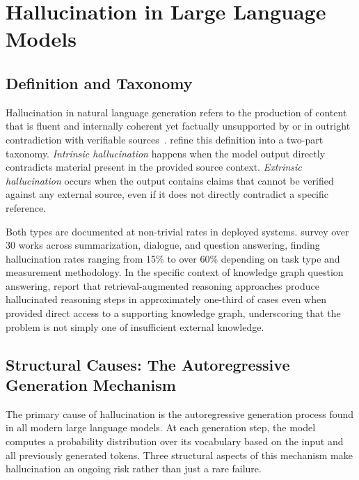 \section{Hallucination in Large Language Models}
\label{sec:hallucination}

\subsection{Definition and Taxonomy}

Hallucination in natural language generation refers to the production of content that is fluent and internally coherent yet factually unsupported by or in outright contradiction with verifiable sources~\citep{ji2023survey}. \citet{huang2023hallucination} refine this definition into a two-part taxonomy. \textit{Intrinsic hallucination} happens when the model output directly contradicts material present in the provided source context. \textit{Extrinsic hallucination} occurs when the output contains claims that cannot be verified against any external source, even if it does not directly contradict a specific reference.

Both types are documented at non-trivial rates in deployed systems. \citet{ji2023survey} survey over 30 works across summarization, dialogue, and question answering, finding hallucination rates ranging from 15\% to over 60\% depending on task type and measurement methodology. In the specific context of knowledge graph question answering, \citet{luo2025-graph-constrained-reasoning} report that retrieval-augmented reasoning approaches produce hallucinated reasoning steps in approximately one-third of cases even when provided direct access to a supporting knowledge graph, underscoring that the problem is not simply one of insufficient external knowledge.

\subsection{Structural Causes: The Autoregressive Generation Mechanism}

The primary cause of hallucination is the autoregressive generation process found in all modern large language models. At each generation step, the model computes a probability distribution over its vocabulary based on the input and all previously generated tokens. Three structural aspects of this mechanism make hallucination an ongoing risk rather than just a rare failure.

